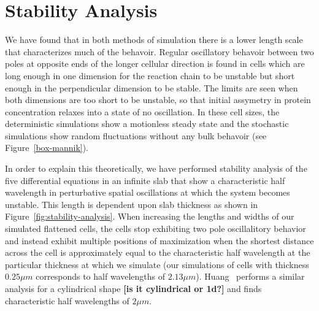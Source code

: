 \documentclass[letterpaper,twocolumn,amsmath,amssymb,pre]{revtex4-1}
\newcommand{\red}[1]{{\bf \color{red} #1}}
\newcommand{\fixme}[1]{\red{[#1]}}
\begin{document}
\section{Stability Analysis}
We have found that in both methods of simulation there is a lower
length scale that characterizes much of the behavoir.  Regular
oscillatory behavoir between two poles at opposite ends of the longer
cellular direction is found in cells which are long enough in one
dimension for the reaction chain to be unstable but short enough in
the perpendicular dimension to be stable.  The limits are seen when
both dimensions are too short to be unstable, so that initial
assymetry in protein concentration relaxes into a state of no
oscillation.  In these cell sizes, the deterministic simulations show
a motionless steady state and the stochastic simulations show random
fluctuations without any bulk behavoir (see Figure~\ref{box-mannik}).

In order to explain this theoretically, we have performed stability
analysis of the five differential equations in an infinite slab that
show a characteristic half wavelength in perturbative spatial
oscillations at which the system becomes unstable.  This length is
dependent upon slab thickness as shown in
Figure~\ref{fig:stability-analysis}.  When increasing the lengths and
widths of our simulated flattened cells, the cells stop exhibiting two
pole oscillalitory behavior and instead exhibit multiple positions of
maximization when the shortest distance across the cell is
approximately equal to the characteristic half wavelength at the
particular thickness at which we simulate (our simulations of cells
with thickness $0.25\mu m$ corresponds to half wavelengths of $2.13\mu
m$).  Huang~\cite{huang2003dynamic} performs a similar analysis for a
cylindrical shape \fixme{is it cylindrical or 1d?} and finds
characteristic half wavelengths of $2\mu m$.
\end{document}
